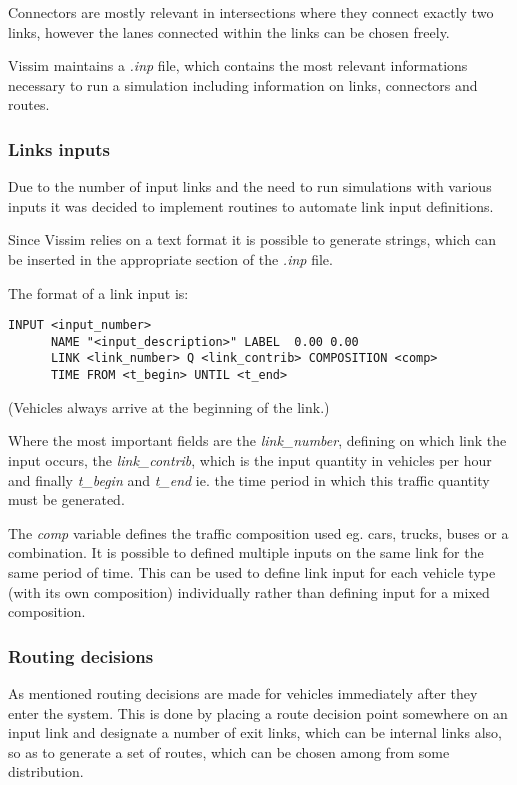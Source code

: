 Connectors are mostly relevant in intersections where they connect exactly two links, however the lanes connected within the links can be chosen freely.

Vissim maintains a \textit{.inp} file, which contains the most relevant informations necessary to run a simulation including information on links, connectors and routes. 

\subsubsection*{Links inputs}
Due to the number of input links and the need to run simulations with various inputs it was decided to implement routines to automate link input definitions.

Since Vissim relies on a text format it is possible to generate strings, which can be inserted in the appropriate section of the \textit{.inp} file.

The format of a link input is:
\begin{verbatim}
INPUT <input_number>
      NAME "<input_description>" LABEL  0.00 0.00
      LINK <link_number> Q <link_contrib> COMPOSITION <comp>
      TIME FROM <t_begin> UNTIL <t_end>
\end{verbatim}

(Vehicles always arrive at the beginning of the link.)

Where the most important fields are the \textit{link_number}, defining on which link the input occurs, the \textit{link_contrib}, which is the input quantity in vehicles per hour and finally \textit{t_begin} and \textit{t_end} ie. the time period in which this traffic quantity must be generated.

The \textit{comp} variable defines the traffic composition used eg. cars, trucks, buses or a combination. It is possible to defined multiple inputs on the same link for the same period of time. This can be used to define link input for each vehicle type (with its own composition) individually rather than defining input for a mixed composition.

\subsubsection*{Routing decisions}
As mentioned routing decisions are made for vehicles immediately after they enter the system. This is done by placing a route decision point somewhere on an input link and designate a number of exit links, which can be internal links also, so as to generate a set of routes, which can be chosen among from some distribution.

